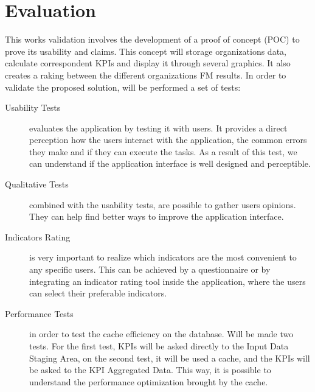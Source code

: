 
% 
% 

\section{Evaluation}
\label{Evaluation}

This works validation involves the development of a proof of concept (POC) to prove its usability and claims. This concept will storage organizations data, calculate correspondent KPIs and display it through several graphics. It also creates a raking between the different organizations FM results. 
In order to validate the proposed solution, will be performed a set of tests:

\begin{description}
	\item [Usability Tests] evaluates the application by testing it with users. It provides a direct perception how the users interact with the application, the common errors they make and if they can execute the tasks. As a result of this test, we can understand if the application interface is well designed and perceptible.\\

	\item [Qualitative Tests] combined with the usability tests, are possible to gather users opinions. They can help find better ways to improve the application interface.\\

	\item [Indicators Rating] is very important to realize which indicators are the most convenient to any specific users. This can be achieved by a questionnaire or by integrating an indicator rating tool inside the application, where the users can select their preferable indicators.\\

	\item [Performance Tests] in order to test the cache efficiency on the database. Will be made two tests. For the first test, KPIs will be asked directly to the Input Data Staging Area, on the second test, it will be used a cache, and the KPIs will be asked to the KPI Aggregated Data. This way, it is possible to understand the performance optimization brought by the cache. 
\end{description}


